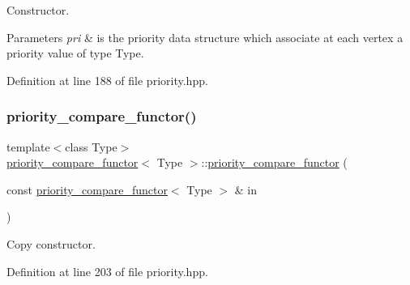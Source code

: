 Constructor. 


\begin{DoxyParams}{Parameters}
{\em pri} & is the priority data structure which associate at each vertex a priority value of type Type. \\
\hline
\end{DoxyParams}


Definition at line 188 of file priority.\+hpp.

\mbox{\label{structpriority__compare__functor_aa2d7c2fe4e4be53431af5992088285b9}} 
\subsubsection{\texorpdfstring{priority\+\_\+compare\+\_\+functor()}{priority\_compare\_functor()}\hspace{0.1cm}{\footnotesize\ttfamily [2/2]}}
{\footnotesize\ttfamily template$<$class Type$>$ \\
\hyperlink{structpriority__compare__functor}{priority\+\_\+compare\+\_\+functor}$<$ Type $>$\+::\hyperlink{structpriority__compare__functor}{priority\+\_\+compare\+\_\+functor} (\begin{DoxyParamCaption}\item[{const \hyperlink{structpriority__compare__functor}{priority\+\_\+compare\+\_\+functor}$<$ Type $>$ \&}]{in }\end{DoxyParamCaption})\hspace{0.3cm}{\ttfamily [inline]}}



Copy constructor. 



Definition at line 203 of file priority.\+hpp.

\mbox{\label{structpriority__compare__functor_a9410926dd790146cbb589a0b307cf7bc}} 
